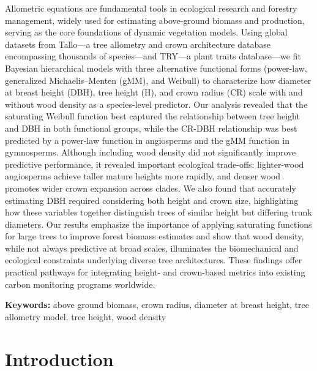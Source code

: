 \documentclass[
  12pt,
  letterpaper,
  DIV=11,
  numbers=noendperiod]{scrartcl}
\begin{document}
Allometric equations are fundamental tools in ecological research and
forestry management, widely used for estimating above-ground biomass and
production, serving as the core foundations of dynamic vegetation
models. Using global datasets from Tallo---a tree allometry and crown
architecture database encompassing thousands of species---and TRY---a
plant traits database---we fit Bayesian hierarchical models with three
alternative functional forms (power-law, generalized Michaelis--Menten
(gMM), and Weibull) to characterize how diameter at breast height (DBH),
tree height (H), and crown radius (CR) scale with and without wood
density as a species-level predictor. Our analysis revealed that the
saturating Weibull function best captured the relationship between tree
height and DBH in both functional groups, while the CR-DBH relationship
was best predicted by a power-law function in angiosperms and the gMM
function in gymnosperms. Although including wood density did not
significantly improve predictive performance, it revealed important
ecological trade-offs: lighter-wood angiosperms achieve taller mature
heights more rapidly, and denser wood promotes wider crown expansion
across clades. We also found that accurately estimating DBH required
considering both height and crown size, highlighting how these variables
together distinguish trees of similar height but differing trunk
diameters. Our results emphasize the importance of applying saturating
functions for large trees to improve forest biomass estimates and show
that wood density, while not always predictive at broad scales,
illuminates the biomechanical and ecological constraints underlying
diverse tree architectures. These findings offer practical pathways for
integrating height- and crown-based metrics into existing carbon
monitoring programs worldwide.

\textbf{Keywords:} above ground biomass, crown radius, diameter at
breast height, tree allometry model, tree height, wood density

\hypertarget{introduction}{%
\section{Introduction}\label{introduction}}
\end{document}

